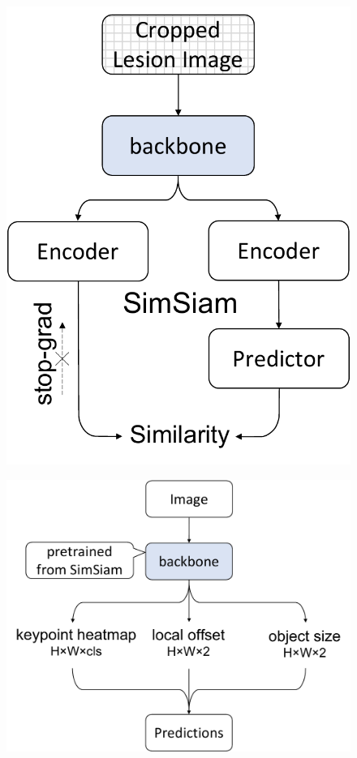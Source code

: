 \documentclass[conference]{IEEEtran}
\begin{document}
        \begin{figure}[t]
            \centering
            \begin{minipage}[t]{.36\linewidth}
                \centering
                \includegraphics[width=\linewidth]{../../fig/simsiam_s.pdf}
                \label{fig:simsiam}
            \end{minipage}
            \begin{minipage}[t]{.6\linewidth}
                \centering
                \includegraphics[width=\linewidth]{../..//fig/centernet_s.pdf}

\end{minipage}
\end{figure}
\end{document}
